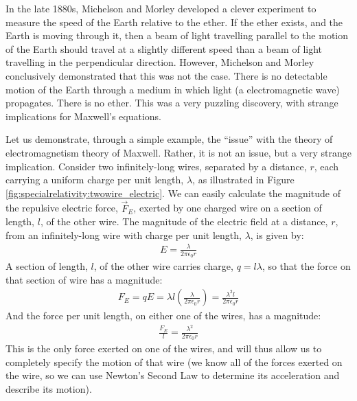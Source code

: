 In the late 1880s, Michelson and Morley developed a clever experiment to measure the speed of the Earth relative to the ether. If the ether exists, and the Earth is moving through it, then a beam of light travelling parallel to the motion of the Earth should travel at a slightly different speed than a beam of light travelling in the perpendicular direction. However, Michelson and Morley conclusively demonstrated that this was not the case. There is no detectable motion of the Earth through a medium in which light (a electromagnetic wave) propagates. There is no ether. This was a very puzzling discovery, with strange implications for Maxwell's equations. 

Let us demonstrate, through a simple example, the ``issue'' with the theory of electromagnetism theory of Maxwell. Rather, it is not an issue, but a very strange implication. Consider two infinitely-long wires, separated by a distance, $r$, each carrying a uniform charge per unit length, $\lambda$, as illustrated in Figure \ref{fig:specialrelativity:twowire_electric}. 
We can easily calculate the magnitude of the repulsive electric force, $\vec F_E$, exerted by one charged wire on a section of length, $l$, of the other wire. The magnitude of the electric field at a distance, $r$, from an infinitely-long wire with charge per unit length, $\lambda$, is given by:
\begin{align*}
E = \frac{\lambda}{2\pi \epsilon_0r}
\end{align*}
A section of length, $l$, of the other wire carries charge, $q=l\lambda$, so that the force on that section of wire has a magnitude:
\begin{align*}
F_E=qE=\lambda l \left( \frac{\lambda}{2\pi \epsilon_0r}\right) = \frac{\lambda^2 l}{2\pi \epsilon_0r}
\end{align*}
And the force per unit length, on either one of the wires, has a magnitude:
\begin{align*}
\frac{F_E}{l}=\frac{\lambda^2}{2\pi \epsilon_0r}
\end{align*}
This is the only force exerted on one of the wires, and will thus allow us to completely specify the motion of that wire (we know all of the forces exerted on the wire, so we can use Newton's Second Law to determine its acceleration and describe its motion).

